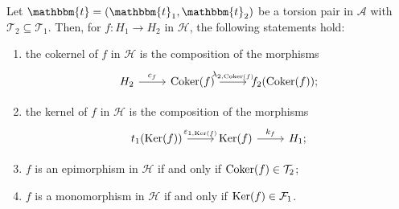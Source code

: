 \begin{corollary}\label{cor:2.3}
  Let $\mathbbm{t}=(\mathbbm{t}_1,\mathbbm{t}_2)$ be a torsion pair in $\mathscr{A}$ with $\mathcal{T}_2\subseteq\mathcal{T}_1$.
  Then, for $f:H_1\to H_2$ in $\mathcal{H}$, the following statements hold:
  \begin{enumerate}[label=(\alph*),ref=(\alph*)]
    \item\label{cor:2.3:a} the cokernel of $f$ in $\mathcal{H}$ is the composition of the morphisms
      \begin{equation*}
        \begin{tikzcd}
          H_2\arrow{r}{c_f}&\Coker(f)\arrow{r}{\lambda_{2,\Coker(f)}}&f_2(\Coker(f));
        \end{tikzcd}
      \end{equation*}
    \item\label{cor:2.3:b} the kernel of $f$ in $\mathcal{H}$ is the composition of the morphisms
      \begin{equation*}
        \begin{tikzcd}
          t_1(\Ker(f))\arrow{r}{\varepsilon_{1,\Ker(f)}}&\Ker(f)\arrow{r}{k_f}&H_1;
        \end{tikzcd}
      \end{equation*}
    \item\label{cor:2.3:c} $f$ is an epimorphism in $\mathcal{H}$ if and only if $\operatorname{Coker}(f)\in\mathcal{T}_2$;
    \item\label{cor:2.3:d} $f$ is a monomorphism in $\mathcal{H}$ if and only if $\operatorname{Ker}(f)\in\mathcal{F}_1$.
  \end{enumerate}
\end{corollary}

